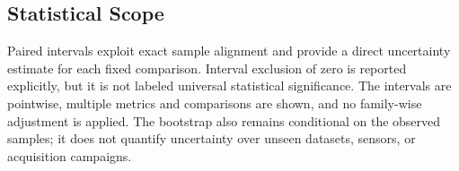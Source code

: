 \subsection{Statistical Scope}

Paired intervals exploit exact sample alignment and provide a direct uncertainty estimate for each fixed comparison. Interval exclusion of zero is reported explicitly, but it is not labeled universal statistical significance. The intervals are pointwise, multiple metrics and comparisons are shown, and no family-wise adjustment is applied. The bootstrap also remains conditional on the observed samples; it does not quantify uncertainty over unseen datasets, sensors, or acquisition campaigns.
